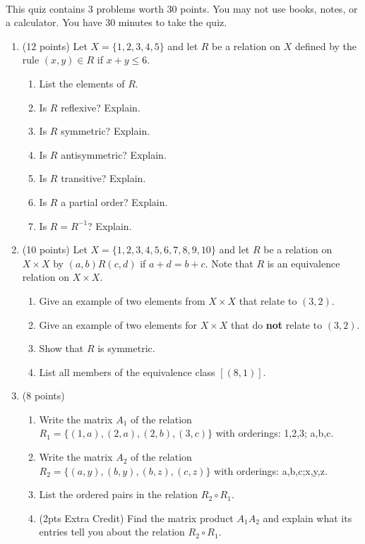 \documentclass[12pt]{article}
\newcommand{\be}{\begin{enumerate}}
\newcommand{\ee}{\end{enumerate}}
\begin{document}
\thispagestyle{fancy}


\\

\noindent This quiz contains 3 problems worth 30 points. You may not use books, notes, or a calculator. You have 30 minutes to take the quiz.\\

\noindent \hrulefill
\be
\item (12 points) Let $X=\{1,2,3,4,5\}$ and let $R$ be a relation on $X$ defined by the rule $(x,y) \in R$ if $x+y \leq 6.$
\be
\item List the elements of $R.$
\vfill
\item Is $R$ reflexive? Explain.
\vfill
\item Is $R$ symmetric? Explain.
\vfill
\item Is $R$ antisymmetric? Explain.
\vfill
\item Is $R$ transitive? Explain.
\vfill
\item Is $R$ a partial order? Explain.
\vfill
\item Is $R=R^{-1}$? Explain.
\vfill
\ee
\newpage
\item (10 points) Let $X=\{1,2,3,4,5,6,7,8,9,10\}$ and let  $R$ be a relation on $X \times X$ by $(a,b)R(c,d)$ if $a+d=b+c.$ Note that $R$ is an equivalence relation on $X \times X.$
\be
\item Give an example of two elements from $X \times X$ that relate to $(3,2).$
\vfill
\item Give an example of two elements for $X \times X$ that do \textbf{not} relate to $(3,2).$
\vfill
\item Show that $R$ is symmetric.
\vspace{1in}
\item List all members of the equivalence class $[ (8,1) ].$
\vfill
\ee
\item (8 points) 
\be
\item Write the matrix $A_1$ of the relation $R_1=\{(1,a),(2,a),(2,b),(3,c)\}$ with orderings: 1,2,3; a,b,c.
\vspace{1in}
\item Write the matrix $A_2$ of the relation $R_2=\{(a,y),(b,y),(b,z),(c,z)\}$ with orderings: a,b,c;x,y,z.
\vspace{1in}
\item List the ordered pairs in the relation $R_2 \circ R_1.$
\vfill
\item (2pts Extra Credit) Find the matrix product $A_1A_2$ and explain what its entries tell you about the relation $R_2 \circ R_1.$
\vspace{1in}
\ee
\ee
\end{document}
